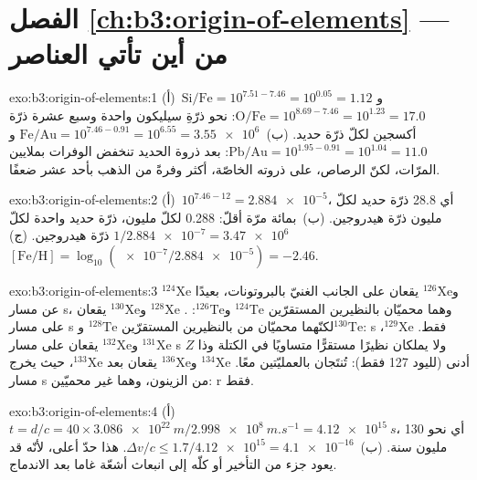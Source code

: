 \section*{الفصل \ref{ch:b3:origin-of-elements} --- من أين تأتي العناصر}

\begin{solution}{exo:b3:origin-of-elements:1}
(أ)~$\mathrm{Si/Fe} = 10^{7.51 - 7.46} = 10^{0.05} = 1.12$
و$\mathrm{O/Fe} = 10^{8.69 - 7.46} = 10^{1.23} = 17.0$: نحو ذرّةِ سيليكون
واحدة وسبع عشرة ذرّة أكسجين لكلّ ذرّة حديد. (ب)~$\mathrm{Fe/Au} =
10^{7.46 - 0.91} = 10^{6.55} = \num{3.55e6}$ و$\mathrm{Pb/Au} =
10^{1.95 - 0.91} = 10^{1.04} = 11.0$: بعد ذروة الحديد تنخفض الوفرات
بملايين المرّات، لكنّ الرصاص، على ذروته الخاصّة، أكثر وفرةً
من الذهب بأحد عشر ضعفًا.
\end{solution}

\begin{solution}{exo:b3:origin-of-elements:2}
(أ)~$10^{7.46 - 12} = \num{2.884e-5}$، أي \num{28.8} ذرّة حديد لكلّ
مليون ذرّة هيدروجين. (ب)~بمائة مرّة أقلّ: \num{0.288} لكلّ
مليون، ذرّة حديد واحدة لكلّ $1/\num{2.884e-7} = \num{3.47e6}$ ذرّة
هيدروجين. (ج)~$[\mathrm{Fe/H}] = \log_{10}(\num{e-7}/\num{2.884e-5}) =
-2.46$.
\end{solution}

\begin{solution}{exo:b3:origin-of-elements:3}
$^{124}\mathrm{Xe}$ و$^{126}\mathrm{Xe}$ يقعان على الجانب الغنيّ بالبروتونات،
بعيدًا عن مسار s، وهما محميّان بالنظيرين المستقرّين $^{124}\mathrm{Te}$
و$^{126}\mathrm{Te}$: . $^{128}\mathrm{Xe}$ و$^{130}\mathrm{Xe}$
يقعان على مسار s لكنّهما محميّان من  بالنظيرين المستقرّين
$^{128}\mathrm{Te}$ و$^{130}\mathrm{Te}$: s فقط. $^{129}\mathrm{Xe}$،
$^{131}\mathrm{Xe}$ و$^{132}\mathrm{Xe}$ يقعان على مسار s ولا يملكان
نظيرًا مستقرًّا متساويًا في الكتلة وذا $Z$ أدنى (لليود 127 فقط): تُنتَجان بالعمليّتين معًا.
$^{134}\mathrm{Xe}$ و$^{136}\mathrm{Xe}$ يقعان بعد
$^{133}\mathrm{Xe}$، حيث يخرج مسار s من الزينون، وهما غير
محميّين: r فقط.
\end{solution}

\begin{solution}{exo:b3:origin-of-elements:4}
(أ)~$t = d/c = 40\times\qty{3.086e22}{m}/\qty{2.998e8}{m.s^{-1}} =
\qty{4.12e15}{s}$، أي نحو \num{130} مليون سنة. (ب)~$\Delta v/c \le
1.7/\num{4.12e15} = \num{4.1e-16}$. هذا حدّ أعلى، لأنّه قد يعود جزء من التأخير أو
كلّه إلى انبعاث أشعّة غاما بعد
الاندماج.
\end{solution}

